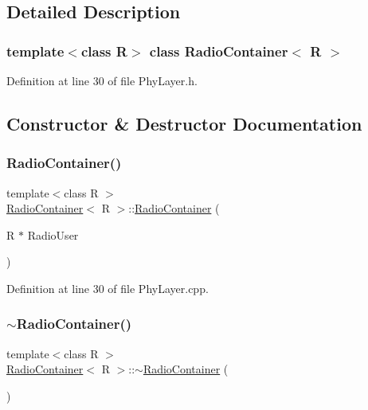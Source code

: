 \subsection{Detailed Description}
\subsubsection*{template$<$class R$>$\newline
class Radio\+Container$<$ R $>$}



Definition at line 30 of file Phy\+Layer.\+h.



\subsection{Constructor \& Destructor Documentation}
\mbox{\label{class_radio_container_acba7b3f419573dc72a58e000072b1d15}} 
\subsubsection{\texorpdfstring{Radio\+Container()}{RadioContainer()}}
{\footnotesize\ttfamily template$<$class R $>$ \\
\mbox{\hyperlink{class_radio_container}{Radio\+Container}}$<$ R $>$\+::\mbox{\hyperlink{class_radio_container}{Radio\+Container}} (\begin{DoxyParamCaption}\item[{R $\ast$}]{Radio\+User }\end{DoxyParamCaption})}



Definition at line 30 of file Phy\+Layer.\+cpp.

\mbox{\label{class_radio_container_af2367ea0e92fa1654a4329d13ed90e47}} 
\subsubsection{\texorpdfstring{$\sim$\+Radio\+Container()}{~RadioContainer()}}
{\footnotesize\ttfamily template$<$class R $>$ \\
\mbox{\hyperlink{class_radio_container}{Radio\+Container}}$<$ R $>$\+::$\sim$\mbox{\hyperlink{class_radio_container}{Radio\+Container}} (\begin{DoxyParamCaption}{ }\end{DoxyParamCaption})}



